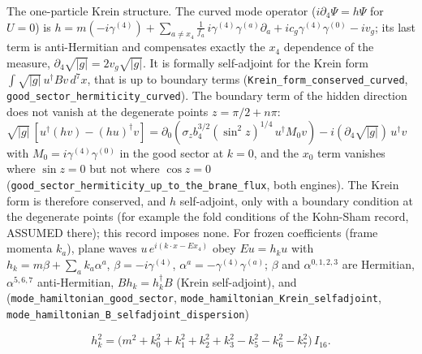 \documentclass[11pt]{article}
\begin{document}
The one-particle Krein structure. The curved mode operator ($i\partial_4\Psi = h\Psi$ for $U = 0$) is $h = m(-i\gamma^{(4)}) + \sum_{a\neq x_4}\frac{1}{f_a}\,i\gamma^{(4)}\gamma^{(a)}\partial_a + ic_g\gamma^{(4)}\gamma^{(0)} - iv_g$; its last term is anti-Hermitian and compensates exactly the $x_4$ dependence of the measure, $\partial_4\sqrt{|g|} = 2v_g\sqrt{|g|}$. It is formally self-adjoint for the Krein form $\int\sqrt{|g|}\,u^\dagger Bv\,d^7x$, that is up to boundary terms (\texttt{Krein\_fo\allowbreak{}rm\_conse\allowbreak{}rved\_cur\allowbreak{}ved}, \texttt{good\_sec\allowbreak{}tor\_herm\allowbreak{}iticity\_\allowbreak{}curved}). The boundary term of the hidden direction does not vanish at the degenerate points $z = \pi/2 + n\pi$: $\sqrt{|g|}\,[u^\dagger(hv) - (hu)^\dagger v] = \partial_0(\sigma_zb_4^{3/2}(\sin^2 z)^{1/4}\,u^\dagger M_0 v) - i(\partial_4\sqrt{|g|})\,u^\dagger v$ with $M_0 = i\gamma^{(4)}\gamma^{(0)}$ in the good sector at $k = 0$, and the $x_0$ term vanishes where $\sin z = 0$ but not where $\cos z = 0$ (\texttt{good\_sec\allowbreak{}tor\_herm\allowbreak{}iticity\_\allowbreak{}up\_to\_th\allowbreak{}e\_brane\_\allowbreak{}flux}, both engines). The Krein form is therefore conserved, and $h$ self-adjoint, only with a boundary condition at the degenerate points (for example the fold conditions of the Kohn-Sham record, ASSUMED there); this record imposes none. For frozen coefficients (frame momenta $k_a$), plane waves $u\,e^{i(k\cdot x - Ex_4)}$ obey $Eu = h_k u$ with $h_k = m\beta + \sum_a k_a\alpha^a$, $\beta = -i\gamma^{(4)}$, $\alpha^a = -\gamma^{(4)}\gamma^{(a)}$; $\beta$ and $\alpha^{0,1,2,3}$ are Hermitian, $\alpha^{5,6,7}$ anti-Hermitian, $Bh_k = h_k^\dagger B$ (Krein self-adjoint), and (\texttt{mode\_ham\allowbreak{}iltonian\allowbreak{}\_good\_se\allowbreak{}ctor}, \texttt{mode\_ham\allowbreak{}iltonian\allowbreak{}\_Krein\_s\allowbreak{}elfadjoi\allowbreak{}nt}, \texttt{mode\_ham\allowbreak{}iltonian\allowbreak{}\_B\_selfa\allowbreak{}djoint\_d\allowbreak{}ispersio\allowbreak{}n})

\[
h_k^2 = \big(m^2 + k_0^2 + k_1^2 + k_2^2 + k_3^2 - k_5^2 - k_6^2 - k_7^2\big)\,I_{16} .
\]
\end{document}
